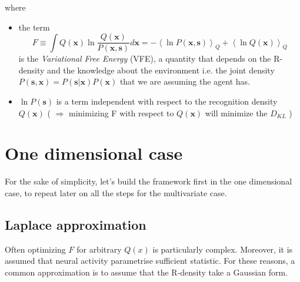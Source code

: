 \documentclass[a4paper, 10pt]{article}
\begin{document}
where
\begin{itemize}

\item the term
\begin{equation}
F \equiv \int Q(\mathbf x) \ln \frac{Q(\mathbf x)}{P(\mathbf x,\mathbf s)}d\mathbf x = - \left< \ln P(\mathbf x,\mathbf s) \right>_{Q} + \left< \ln Q(\mathbf x) \right>_{Q}
\end{equation} 
is the \emph{Variational Free Energy} (VFE), a quantity that depends on the R-density and the knowledge about the environment i.e. the joint density $P(\mathbf s, \mathbf x) = P(\mathbf s|\mathbf x)P(\mathbf x)$ that we are assuming the agent has. 
\item $\ln P(\mathbf s)$ is a term independent with respect to the recognition density $Q(\mathbf x)$ ( $\Rightarrow$ minimizing F with respect to $Q(\mathbf x)$ will minimize the $D_{KL}$ )

\end{itemize}

\section{One dimensional case}
\label{sec:1d}
For the sake of simplicity, let's build the framework first in the one dimensional case, to repeat later on all the steps for the multivariate case.

\subsection{Laplace approximation}
\label{sec:laplace}

Often optimizing $F$ for arbitrary $Q(x)$ is particularly complex. Moreover, it is assumed that neural activity parametrise sufficient statistic.
For these reasons, a common approximation is to assume that the R-density take a Gaussian form. 
\end{document}
